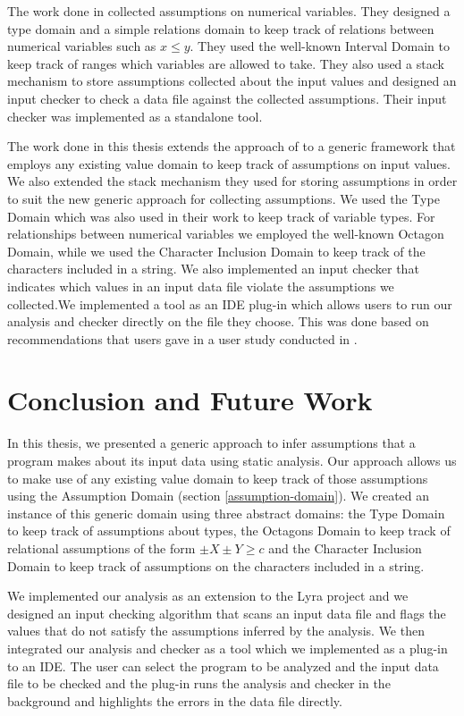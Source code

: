 \documentclass[10pt]{report}
\begin{document}
The work done in \cite{madelin} collected assumptions on numerical variables. They designed a type domain and a simple relations domain to keep track of relations between numerical variables such as $ x \leq y $. They used the well-known Interval Domain \cite{cousot} to keep track of ranges which variables are allowed to take. They also used a stack mechanism to store assumptions collected about the input values and designed an input checker to check a data file against the collected assumptions. Their input checker was implemented as a standalone tool. 

The work done in this thesis extends the approach of \cite{madelin} to a generic framework that employs any existing value domain to keep track of assumptions on input values. We also extended the stack mechanism they used for storing assumptions in order to suit the new generic approach for collecting assumptions. We used the Type Domain which was also used in their work to keep track of variable types. For relationships between numerical variables we employed the well-known Octagon Domain, while we used the Character Inclusion Domain to keep track of the characters included in a string. We also implemented an input checker that indicates which values in an input data file violate the assumptions we collected.We implemented a tool as an IDE plug-in which allows users to run our analysis and checker directly on the file they choose. This was done based on recommendations that users gave in a user study conducted in \cite{madelin}.  


\chapter{Conclusion and Future Work} \label{conclusion}
In this thesis, we presented a generic approach to infer assumptions that a program makes about its input data using static analysis. Our approach allows us to make use of any existing value domain to keep track of those assumptions using the Assumption Domain (section \ref{assumption-domain}). We created an instance of this generic domain using three abstract domains: the Type Domain to keep track of assumptions about types, the Octagons Domain to keep track of relational assumptions of the form $ \pm X \pm Y \geq c $ and the Character Inclusion Domain to keep track of assumptions on the characters included in a string. 

We implemented our analysis as an extension to the Lyra project and we designed an input checking algorithm that scans an input data file and flags the values that do not satisfy the assumptions inferred by the analysis. We then integrated our analysis and checker as a tool which we implemented as a plug-in to an IDE. The user can select the program to be analyzed and the input data file to be checked and the plug-in runs the analysis and checker in the background and highlights the errors in the data file directly. 
\end{document}
